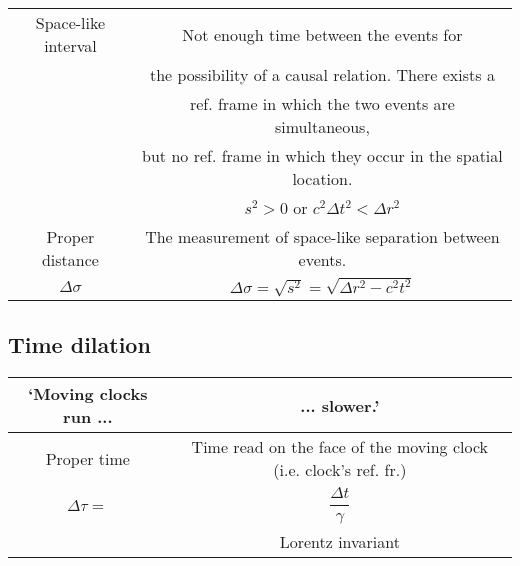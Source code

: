 \begin{tabular}{|c|c|}
\hline

Space-like interval & Not enough time between the events for \\
 & the possibility of a causal relation. There exists a \\
  & ref. frame in which the two events are simultaneous, \\ 
   & but no ref. frame in which they occur in the spatial location. \\ 
   & $s^2 > 0$ or $c^2 \Delta t^2 < \Delta r^2$
   
\\ \hline

Proper distance & The measurement of space-like separation between events. \\
 $\Delta \sigma $ & $\Delta \sigma = \sqrt{s^2} = \sqrt{\Delta r^2 - c^2 t^2} $

\\ \hline
\end{tabular}
\flushleft



\subsection{Time dilation} 
\center
\begin{tabular}{|c|c|}
\hline

`Moving clocks run ... & ... slower.'

\\ \hline

Proper time & Time read on the face of the moving clock (i.e. clock's ref. fr.) \\
$\Delta \tau = $ & $\dfrac{\Delta t}{\gamma}$ \\ 
 & Lorentz invariant
 
\\ \hline
\end{tabular}
\flushleft



